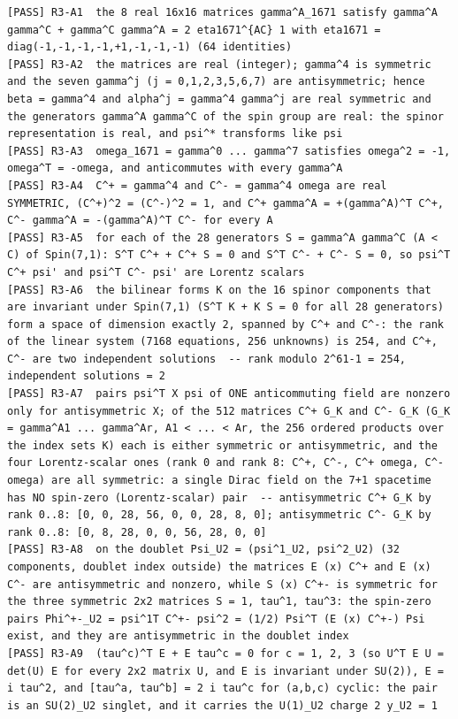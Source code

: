 \documentclass[
  10pt,
]{article}
\begin{document}
\begin{verbatim}
[PASS] R3-A1  the 8 real 16x16 matrices gamma^A_1671 satisfy gamma^A gamma^C + gamma^C gamma^A = 2 eta1671^{AC} 1 with eta1671 = diag(-1,-1,-1,-1,+1,-1,-1,-1) (64 identities)
[PASS] R3-A2  the matrices are real (integer); gamma^4 is symmetric and the seven gamma^j (j = 0,1,2,3,5,6,7) are antisymmetric; hence beta = gamma^4 and alpha^j = gamma^4 gamma^j are real symmetric and the generators gamma^A gamma^C of the spin group are real: the spinor representation is real, and psi^* transforms like psi
[PASS] R3-A3  omega_1671 = gamma^0 ... gamma^7 satisfies omega^2 = -1, omega^T = -omega, and anticommutes with every gamma^A
[PASS] R3-A4  C^+ = gamma^4 and C^- = gamma^4 omega are real SYMMETRIC, (C^+)^2 = (C^-)^2 = 1, and C^+ gamma^A = +(gamma^A)^T C^+, C^- gamma^A = -(gamma^A)^T C^- for every A
[PASS] R3-A5  for each of the 28 generators S = gamma^A gamma^C (A < C) of Spin(7,1): S^T C^+ + C^+ S = 0 and S^T C^- + C^- S = 0, so psi^T C^+ psi' and psi^T C^- psi' are Lorentz scalars
[PASS] R3-A6  the bilinear forms K on the 16 spinor components that are invariant under Spin(7,1) (S^T K + K S = 0 for all 28 generators) form a space of dimension exactly 2, spanned by C^+ and C^-: the rank of the linear system (7168 equations, 256 unknowns) is 254, and C^+, C^- are two independent solutions  -- rank modulo 2^61-1 = 254, independent solutions = 2
[PASS] R3-A7  pairs psi^T X psi of ONE anticommuting field are nonzero only for antisymmetric X; of the 512 matrices C^+ G_K and C^- G_K (G_K = gamma^A1 ... gamma^Ar, A1 < ... < Ar, the 256 ordered products over the index sets K) each is either symmetric or antisymmetric, and the four Lorentz-scalar ones (rank 0 and rank 8: C^+, C^-, C^+ omega, C^- omega) are all symmetric: a single Dirac field on the 7+1 spacetime has NO spin-zero (Lorentz-scalar) pair  -- antisymmetric C^+ G_K by rank 0..8: [0, 0, 28, 56, 0, 0, 28, 8, 0]; antisymmetric C^- G_K by rank 0..8: [0, 8, 28, 0, 0, 56, 28, 0, 0]
[PASS] R3-A8  on the doublet Psi_U2 = (psi^1_U2, psi^2_U2) (32 components, doublet index outside) the matrices E (x) C^+ and E (x) C^- are antisymmetric and nonzero, while S (x) C^+- is symmetric for the three symmetric 2x2 matrices S = 1, tau^1, tau^3: the spin-zero pairs Phi^+-_U2 = psi^1T C^+- psi^2 = (1/2) Psi^T (E (x) C^+-) Psi exist, and they are antisymmetric in the doublet index
[PASS] R3-A9  (tau^c)^T E + E tau^c = 0 for c = 1, 2, 3 (so U^T E U = det(U) E for every 2x2 matrix U, and E is invariant under SU(2)), E = i tau^2, and [tau^a, tau^b] = 2 i tau^c for (a,b,c) cyclic: the pair is an SU(2)_U2 singlet, and it carries the U(1)_U2 charge 2 y_U2 = 1

\end{verbatim}
\end{document}
